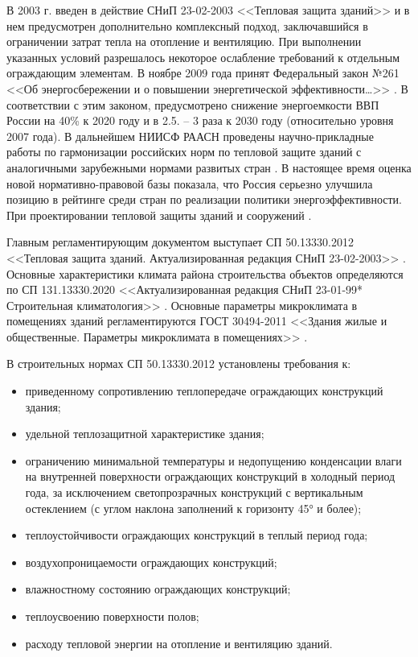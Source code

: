 В 2003 г. введен в действие СНиП 23-02-2003 <<Тепловая защита зданий>> \cite{law_RU_Rules_Code_ThermalPerformance} и в нем предусмотрен дополнительно комплексный подход, заключавшийся в ограничении затрат тепла на отопление и вентиляцию. При выполнении указанных условий разрешалось некоторое ослабление требований к отдельным ограждающим элементам. 
В ноябре 2009 года принят Федеральный закон №261 <<Об энергосбережении и о повышении энергетической эффективности…>> \cite{law_RU_fz_EnergyEff}.
В соответствии с этим законом, предусмотрено снижение энергоемкости ВВП России на 40\% к 2020 году и в 2.5. – 3 раза к 2030 году (относительно уровня 2007 года).
В дальнейшем НИИСФ РААСН проведены научно-прикладные работы по гармонизации российских норм по тепловой защите зданий с аналогичными зарубежными нормами развитых стран \Code{[16]}.
В настоящее время оценка новой нормативно-правовой базы показала, что Россия серьезно улучшила позицию в рейтинге среди стран по реализации политики энергоэффективности.
При проектировании тепловой защиты зданий и сооружений \Code{[17]}.

Главным регламентирующим документом выступает СП 50.13330.2012 <<Тепловая защита зданий. Актуализированная редакция СНиП 23-02-2003>> \cite{law_RU_Rules_Code_ThermalPerformance}.
Основные характеристики климата района строительства объектов определяются по СП 131.13330.2020 <<Актуализированная редакция СНиП 23-01-99* Строительная климатология>> \cite{law_RU_RulesCode_BuildingClimatology}.
Основные параметры микроклимата в помещениях зданий регламентируются ГОСТ 30494-2011 <<Здания жилые и общественные. Параметры микроклимата в помещениях>> \cite{law_RU_RulesCode_BuildingMicroclimateResedentialPublic}.

В строительных нормах СП 50.13330.2012 \cite{law_RU_Rules_Code_ThermalPerformance} установлены требования к:
\begin{itemize}
    \item приведенному сопротивлению теплопередаче ограждающих конструкций здания;
    \item удельной теплозащитной характеристике здания;
    \item ограничению минимальной температуры и недопущению конденсации влаги на внутренней поверхности ограждающих конструкций в холодный период года, за исключением светопрозрачных конструкций с вертикальным остеклением (с углом наклона заполнений к горизонту 45° и более);
    \item теплоустойчивости ограждающих конструкций в теплый период года;
    \item воздухопроницаемости ограждающих конструкций;
    \item влажностному состоянию ограждающих конструкций;
    \item теплоусвоению поверхности полов;
    \item расходу тепловой энергии на отопление и вентиляцию зданий.
\end{itemize}



